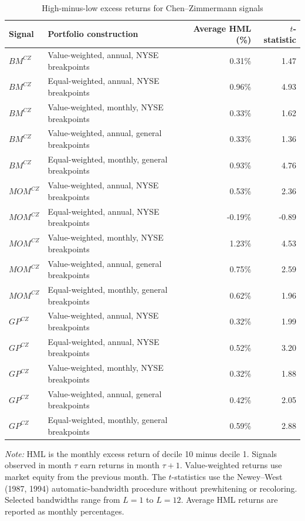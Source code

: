 \begin{table}[htbp]
\centering
\caption{High-minus-low excess returns for Chen--Zimmermann signals}
\label{tab:q3c_hml_results}
\begin{tabular}{llrr}
\toprule
Signal & Portfolio construction & Average HML (\%) & $t$-statistic \\
\midrule
$BM^{CZ}$ & Value-weighted, annual, NYSE breakpoints & 0.31\% & 1.47 \\
$BM^{CZ}$ & Equal-weighted, annual, NYSE breakpoints & 0.96\% & 4.93 \\
$BM^{CZ}$ & Value-weighted, monthly, NYSE breakpoints & 0.33\% & 1.62 \\
$BM^{CZ}$ & Value-weighted, annual, general breakpoints & 0.33\% & 1.36 \\
$BM^{CZ}$ & Equal-weighted, monthly, general breakpoints & 0.93\% & 4.76 \\
$MOM^{CZ}$ & Value-weighted, annual, NYSE breakpoints & 0.53\% & 2.36 \\
$MOM^{CZ}$ & Equal-weighted, annual, NYSE breakpoints & -0.19\% & -0.89 \\
$MOM^{CZ}$ & Value-weighted, monthly, NYSE breakpoints & 1.23\% & 4.53 \\
$MOM^{CZ}$ & Value-weighted, annual, general breakpoints & 0.75\% & 2.59 \\
$MOM^{CZ}$ & Equal-weighted, monthly, general breakpoints & 0.62\% & 1.96 \\
$GP^{CZ}$ & Value-weighted, annual, NYSE breakpoints & 0.32\% & 1.99 \\
$GP^{CZ}$ & Equal-weighted, annual, NYSE breakpoints & 0.52\% & 3.20 \\
$GP^{CZ}$ & Value-weighted, monthly, NYSE breakpoints & 0.32\% & 1.88 \\
$GP^{CZ}$ & Value-weighted, annual, general breakpoints & 0.42\% & 2.05 \\
$GP^{CZ}$ & Equal-weighted, monthly, general breakpoints & 0.59\% & 2.88 \\
\bottomrule
\end{tabular}
\begin{minipage}{0.96\textwidth}
\footnotesize\textit{Note:} HML is the monthly excess return of decile 10 minus decile 1. Signals observed in month $\tau$ earn returns in month $\tau+1$. Value-weighted returns use market equity from the previous month. The $t$-statistics use the Newey--West (1987, 1994) automatic-bandwidth procedure without prewhitening or recoloring. Selected bandwidths range from $L=1$ to $L=12$. Average HML returns are reported as monthly percentages.
\end{minipage}
\end{table}
